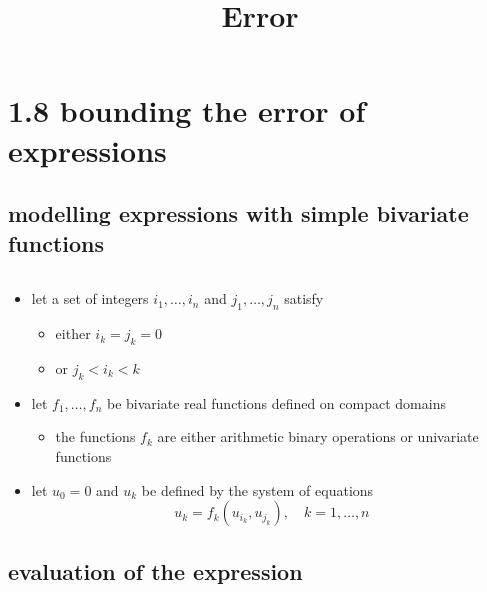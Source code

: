 \documentclass[11pt]{article}
\title{Error}
\providecommand{\tightlist}{%
      \setlength{\itemsep}{0pt}\setlength{\parskip}{0pt}}
\begin{document}
    
    
    \maketitle
    
    

    
    \section{1.8 bounding the error of
expressions}\label{bounding-the-error-of-expressions}

\subsection{modelling expressions with simple bivariate
functions}\label{modelling-expressions-with-simple-bivariate-functions}

\[\renewcommand{\R}{\mathbb{R}}\]

\begin{itemize}
\tightlist
\item
  let a set of integers \(i_1,\ldots,i_n\) and \(j_1,\ldots,j_n\)
  satisfy

  \begin{itemize}
  \tightlist
  \item
    either \(i_k=j_k=0\)
  \item
    or \(j_k < i_k < k\)
  \end{itemize}
\item
  let \(f_1,\ldots, f_n\) be bivariate real functions defined on compact
  domains

  \begin{itemize}
  \tightlist
  \item
    the functions \(f_k\) are either arithmetic binary operations or
    univariate functions
  \end{itemize}
\item
  let \(u_0=0\) and \(u_k\) be defined by the system of equations
  \[u_k = f_k(u_{i_k}, u_{j_k}), \quad k=1,\ldots,n\]
\end{itemize}

\subsection{evaluation of the
expression}\label{evaluation-of-the-expression}
\end{document}
